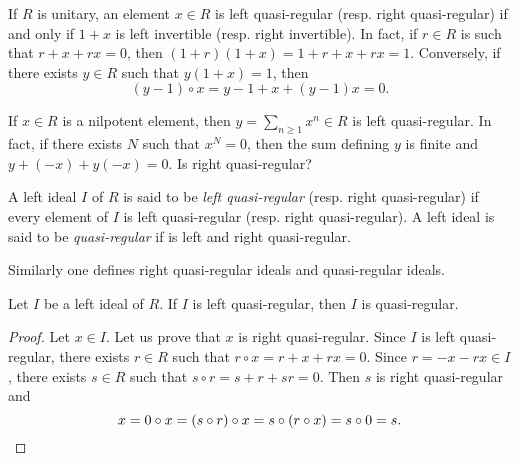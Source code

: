 If $R$ is unitary, an element $x\in R$ is left quasi-regular (resp. right quasi-regular)
if and only if $1+x$ is left invertible (resp. right invertible). In fact, 
if $r\in R$ is such that $r+x+rx=0$, then $(1+r)(1+x)=1+r+x+rx=1$.
Conversely, if there exists $y\in R$ such that $y(1+x)=1$, then  
\[
(y-1)\circ x=y-1+x+(y-1)x=0.
\]

\begin{example}
	If $x\in R$ is a nilpotent element, 
    then $y=\sum_{n\geq1}x^n\in R$ is left quasi-regular. 
	In fact, if there exists $N$ such that $x^N=0$, 
    then the sum defining $y$ is finite 
    and $y+(-x)+y(-x)=0$.  Is right quasi-regular?
\end{example}

\begin{definition}
A left ideal $I$ of $R$ is said to be 
\emph{left quasi-regular} (resp. right quasi-regular) if every element of $I$ is
left quasi-regular (resp. right quasi-regular). A left ideal 
is said to be \emph{quasi-regular} if is left and right quasi-regular. 
\end{definition}

Similarly 
one defines right quasi-regular ideals and quasi-regular ideals. 

\begin{lemma}
	\label{lemma:casiregular}
	Let $I$ be a left ideal of $R$. If $I$ is left quasi-regular, then 
	$I$ is quasi-regular.
\end{lemma}

\begin{proof}
	Let $x\in I$. Let us prove that $x$ is right quasi-regular. Since $I$ is
	left quasi-regular, there exists $r\in R$ such that $r\circ x=r+x+rx=0$. Since 
	$r=-x-rx\in I$, there exists $s\in R$ such that $s\circ
	r=s+r+sr=0$. Then $s$ is right quasi-regular and  
	\[
	x=0\circ x=(s\circ r)\circ x=s\circ (r\circ x)=s\circ 0=s.\qedhere
	\]
\end{proof}

